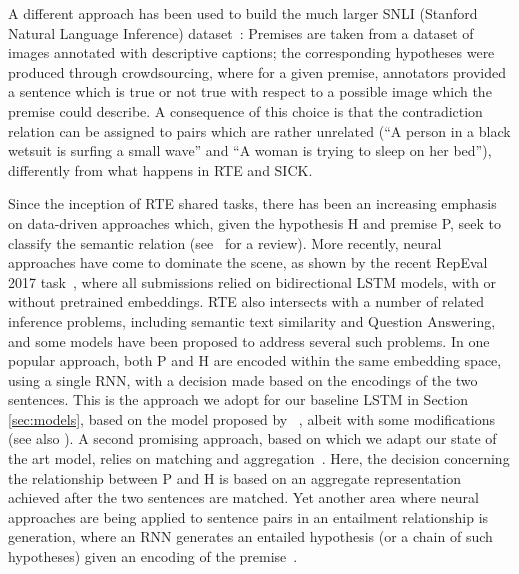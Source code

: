 \documentclass[11pt]{article}
\begin{document}
A different approach has
been used to build the much larger SNLI (Stanford Natural Language
Inference) dataset~\cite{snli:emnlp2015}: Premises are taken from a
dataset of images annotated with descriptive captions; the corresponding hypotheses
were produced through crowdsourcing, where for a given premise, annotators
provided a sentence which is true or not true with respect to a
possible image which the premise could describe. A consequence of this
choice is that the contradiction relation can be assigned to pairs
which are rather unrelated (``A person in a black wetsuit is surfing a
small wave'' and ``A woman is trying to sleep on her bed''),
differently from what happens in RTE and SICK.

Since the inception of RTE shared tasks, there has been an increasing emphasis on data-driven 
approaches which, given the hypothesis H and premise P, seek to classify the semantic relation (see~\cite{Sammons2012} 
for a review). More recently, neural approaches have come to dominate the scene, as shown by the 
recent RepEval 2017 task~\cite{Nangia2017}, where all submissions relied on bidirectional LSTM models, with or without pretrained embeddings. RTE also intersects with a number of related inference problems, including semantic text similarity and Question Answering, and some models have been proposed to address several such problems. In one popular approach, both P and H are encoded within the same embedding space, using a single RNN, with a decision made based on the encodings of the two sentences. This is the approach we adopt for our baseline LSTM in Section \ref{sec:models}, based on the model proposed by ~, albeit with some modifications (see also \cite{Tan2016}). A second promising approach, based on which we adapt our state of the art model, relies on matching and aggregation~\cite{Wang2017}. Here, the decision concerning the relationship between P and H is based on an aggregate representation achieved after the two sentences are matched. Yet another area where neural approaches are being applied to sentence pairs in an entailment relationship is generation, where an RNN generates an entailed hypothesis (or a chain of such hypotheses) given an encoding of the premise~\cite{Kolesnyk2016,Starc2017}.
\end{document}
